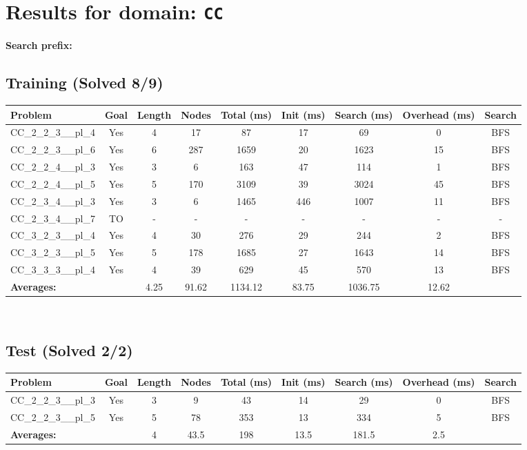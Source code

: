 \documentclass{article}
\begin{document}
\section*{Results for domain: \texttt{CC}}
\textbf{Search prefix:} 
\\[0.5cm]
\subsection*{Training (Solved 8/9)}
\begin{tabular}{lcccccccc}
\toprule
Problem & Goal & Length & Nodes & Total (ms) & Init (ms) & Search (ms) & Overhead (ms) & Search \\
\midrule
CC\_2\_2\_3\_\_pl\_4 & Yes & 4 & 17 & 87 & 17 & 69 & 0 & BFS \\
CC\_2\_2\_3\_\_pl\_6 & Yes & 6 & 287 & 1659 & 20 & 1623 & 15 & BFS \\
CC\_2\_2\_4\_\_pl\_3 & Yes & 3 & 6 & 163 & 47 & 114 & 1 & BFS \\
CC\_2\_2\_4\_\_pl\_5 & Yes & 5 & 170 & 3109 & 39 & 3024 & 45 & BFS \\
CC\_2\_3\_4\_\_pl\_3 & Yes & 3 & 6 & 1465 & 446 & 1007 & 11 & BFS \\
CC\_2\_3\_4\_\_pl\_7 & TO & - & - & - & - & - & - & - \\
CC\_3\_2\_3\_\_pl\_4 & Yes & 4 & 30 & 276 & 29 & 244 & 2 & BFS \\
CC\_3\_2\_3\_\_pl\_5 & Yes & 5 & 178 & 1685 & 27 & 1643 & 14 & BFS \\
CC\_3\_3\_3\_\_pl\_4 & Yes & 4 & 39 & 629 & 45 & 570 & 13 & BFS \\
\textbf{Averages:} & & 4.25 & 91.62 & 1134.12 & 83.75 & 1036.75 & 12.62 & \\
\bottomrule
\end{tabular}
\\[0.7cm]
\subsection*{Test (Solved 2/2)}
\begin{tabular}{lcccccccc}
\toprule
Problem & Goal & Length & Nodes & Total (ms) & Init (ms) & Search (ms) & Overhead (ms) & Search \\
\midrule
CC\_2\_2\_3\_\_pl\_3 & Yes & 3 & 9 & 43 & 14 & 29 & 0 & BFS \\
CC\_2\_2\_3\_\_pl\_5 & Yes & 5 & 78 & 353 & 13 & 334 & 5 & BFS \\
\textbf{Averages:} & & 4 & 43.5 & 198 & 13.5 & 181.5 & 2.5 & \\
\bottomrule
\end{tabular}
\\[0.7cm]
\end{document}
